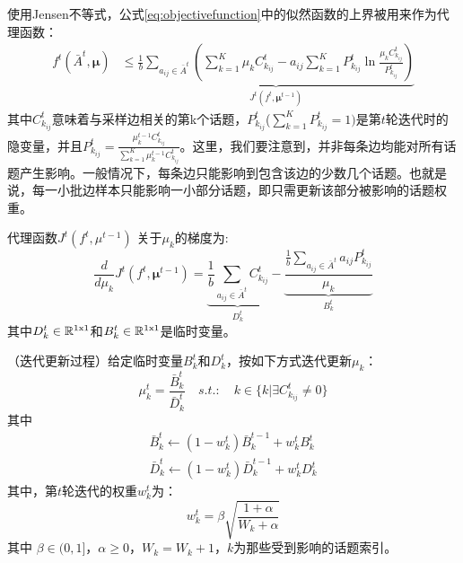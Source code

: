 使用Jensen不等式，公式\eqref{eq:objectivefunction}中的似然函数的上界被用来作为代理函数：
\begin{align}
    f^t(\bar{A}^t,\bm{\mu}) &\leqslant{\underbrace{\frac{1}{b}\sum_{a_{ij} \in \bar{A}^t} \left(\sum_{k=1}^{K}\mu_k C^t_{k_{ij}} - a_{ij}\sum_{k=1}^{K} P^t_{k_{ij}} \ln \frac{\mu_k C^t_{k_{ij}}}{P^t_{k_{ij}}}\right)}_{J^t(f^t,\bm{\mu}^{t-1})}}
\end{align}
其中$C^t_{k_{ij}}$意味着与采样边相关的第k个话题，$P^t_{k_{ij}}$($\sum_{k=1}^{K}P^t_{k_{ij}}=1)$是第$t$轮迭代时的隐变量，并且$P^t_{k_{ij}} = \frac{\mu^{t-1}_k C^t_{k_{ij}}}{\sum_{k=1}^{K}\mu^{t-1}_k C^t_{k_{ij}}}$。这里，我们要注意到，并非每条边均能对所有话题产生影响。一般情况下，每条边只能影响到包含该边的少数几个话题。也就是说，每一小批边样本只能影响一小部分话题，即只需更新该部分被影响的话题权重。

代理函数$J^t(f^t,\mu^{t-1})$ 关于$\mu_k$的梯度为:
\begin{equation} \label{eq:computebnkanddnk}
    \frac{d}{d\mu_k}J^t(f^t,\bm{\mu}^{t-1})=\underbrace{\frac{1}{b}\sum_{a_{ij}\in \bar{A}^t}C^t_{k_{ij}}}_{D^t_k} - \underbrace{\frac{\frac{1}{b}\sum_{a_{ij}\in \bar{A}^t} a_{ij}P^t_{k_{ij}}}{\mu_k}}_{B^t_k}
\end{equation}
其中$D^t_k\in \mathbb{R}^{1 \rm x 1}$和$B^t_k\in \mathbb{R}^{1 \rm x 1}$是临时变量。

\begin{proposition}
   （迭代更新过程）给定临时变量$B^t_k$和$D^t_k$，按如下方式迭代更新$\mu_k$：
	\begin{equation} \label{eq:updatemu}
	    \mu^t_k = \frac{\bar{B}^t_k}{\bar{D}^t_k} \quad s.t.:\quad k \in \{k|\exists C^t_{k_{ij}} \neq 0\}
	\end{equation}
	其中
	\begin{equation} \label{eq:iterativeupdating}
	\begin{split}
	    \bar{B}^t_k \leftarrow (1-w^t_k)\bar{B}^{t-1}_k + w^t_kB^t_k\\
	    \bar{D}^t_k \leftarrow (1-w^t_k)\bar{D}^{t-1}_k + w^t_kD^t_k
	\end{split}
	\end{equation}
	其中，第$t$轮迭代的权重$w^t_k$为：
	\begin{equation} \label{eq:weightupdate}
	    w^t_k = \beta\sqrt{\frac{1+\alpha}{W_k+\alpha}}
	\end{equation}
	其中
	$\beta \in (0,1]$，$\alpha \geq 0$，$W_k = W_k + 1$，$k$为那些受到影响的话题索引。
\end{proposition}

